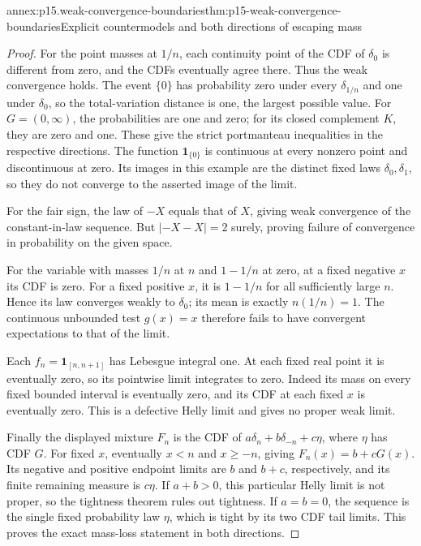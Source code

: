 \begin{annexitem}{annex:p15.weak-convergence-boundaries}{thm:p15-weak-convergence-boundaries}{Explicit countermodels and both directions of escaping mass}
\begin{proof}
For the point masses at \(1/n\), each continuity point of
the CDF of \(\delta_0\) is different from zero, and the CDFs
eventually agree there. Thus the weak convergence holds.
The event \(\{0\}\) has probability zero under every
\(\delta_{1/n}\) and one under \(\delta_0\), so the
total-variation distance is one, the largest possible value.
For \(G=(0,\infty)\), the probabilities are one and zero;
for its closed complement \(K\), they are zero and one.
These give the strict portmanteau inequalities in the
respective directions.
The function \(\mathbf1_{\{0\}}\) is continuous at every
nonzero point and discontinuous at zero. Its images in
this example are the distinct fixed laws \(\delta_0,\delta_1\),
so they do not converge to the asserted image of the limit.

For the fair sign, the law of \(-X\) equals that of \(X\),
giving weak convergence of the constant-in-law sequence.
But \(|-X-X|=2\) surely, proving failure of convergence in
probability on the given space.

For the variable with masses \(1/n\) at \(n\) and \(1-1/n\)
at zero, at a fixed negative \(x\) its CDF is zero.
For a fixed positive \(x\), it is \(1-1/n\) for all
sufficiently large \(n\). Hence its law converges weakly
to \(\delta_0\); its mean is exactly \(n(1/n)=1\).
The continuous unbounded test \(g(x)=x\) therefore fails
to have convergent expectations to that of the limit.

Each \(f_n=\mathbf1_{[n,n+1]}\) has Lebesgue integral one.
At each fixed real point it is eventually zero, so its
pointwise limit integrates to zero. Indeed its mass on
every fixed bounded interval is eventually zero, and
its CDF at each fixed \(x\) is eventually zero. This is
a defective Helly limit and gives no proper weak limit.

Finally the displayed mixture \(F_n\) is the CDF of
\(a\delta_n+b\delta_{-n}+c\eta\), where \(\eta\) has
CDF \(G\). For fixed \(x\), eventually \(x<n\) and
\(x\geq-n\), giving \(F_n(x)=b+cG(x)\).
Its negative and positive endpoint limits are \(b\)
and \(b+c\), respectively, and its finite remaining
measure is \(c\eta\).
If \(a+b>0\), this particular Helly limit is not proper,
so the tightness theorem rules out tightness.
If \(a=b=0\), the sequence is the single fixed probability
law \(\eta\), which is tight by its two CDF tail limits.
This proves the exact mass-loss statement in both directions.
\end{proof}
\end{annexitem}
